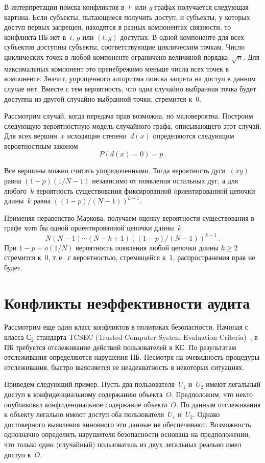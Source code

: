 \begin{multicols}{2}
В интерпретации поиска конфликтов в~\textit{t}- или \textit{g}-гра\-фах
получается следующая картина. Если субъекты, пытающиеся получить
доступ, и субъекты, у которых доступ первых запрещен, находятся в
разных компонентах связности, то конфликта ПБ нет в~$t$, $g$ или
$(t, g)$ доступах. В одной компоненте для всех субъектов доступны
субъекты, соответствующие циклическим точкам. Число циклических
точек в любой компоненте ограничено величиной порядка~$\sqrt{n}$.
Для максимальных компонент это пренебрежимо меньше числа всех точек
в компоненте. Значит, упрощенного алгоритма поиска запрета на доступ
в данном случае нет. Вместе с тем вероятность, что одна случайно
выбранная точка будет доступна из другой случайно выбранной точки,
стремится к~0.

Рассмотрим случай, когда передача прав возможна, но маловероятна. Построим следующую 
вероятностную модель случайного графа, описывающего этот случай. Для всех вершин~$x$ исходящие степени~$d(x)$ 
определяются следующим вероятностным законом
$$
P(d(x)=0)=p\,.
$$

Все вершины можно считать упорядоченными. Тогда вероятность дуги~$(xy)$ 
равна $(1-p)({1}/{N-1})$ независимо от появления остальных
дуг, а для любого~$k$ вероятность существования фиксированной
ориентированной цепочки длины~$k$ равна
$((1-p)/(N-1))^{k-1}$.

Применяя неравенство Маркова, получаем оценку вероятности
существования в графе хотя бы одной ориентированной цепочки длины~$k$
$$
N(N-1)\cdots(N-k+1)((1-p)/(N-1))^{k-1}\,.
$$
При $1-p=o({1}/{N})$ вероятность появления любой цепочки длины
$k\geq 2$ стремится к~0, т.\,е.\ с ве\-ро\-ят\-ностью, стремящейся к~1,
распространения прав не будет.

\section{Конфликты неэффективности аудита}

Рассмотрим еще один класс конфликтов в политиках безопасности.
Начиная с класса С$_2$ стандарта TCSEC (Trusted Computer System Evaluation Criteria)~\cite{b6}, в ПБ требуется
отслеживание действий пользователей в КС. По результатам
отслеживания определяются нарушения ПБ. Несмотря на очевидность
процедуры отслеживания, быстро выясняется ее неадекватность в
некоторых ситуациях.

Приведем следующий пример. Пусть два пользователя~$U_1$ и~$U_2$
имеют легальный доступ к конфиденциальному содержанию объекта~$O$.
Предположим, что некто опубликовал конфиденциальное содержание
объекта~$O$. По данным отслеживания к объекту легально имеют доступ
оба пользователя~$U_1$ и~$U_2$. Однако достоверного выявления
виновного эти данные не обеспечивают. Возможность однозначно
определить нарушителя безопасности основана на предположении, что
только один (случайный) пользователь из двух легальных реально имел
доступ к~$O$.


\end{multicols}
